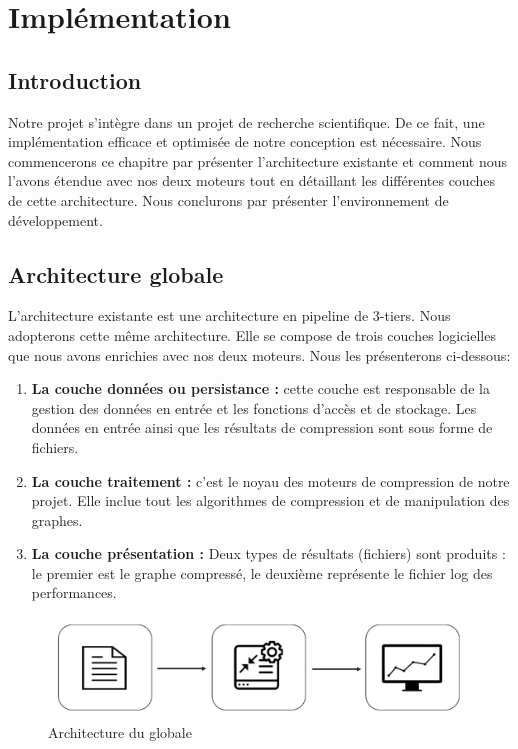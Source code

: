 \chapter{Implémentation}
	\section{Introduction}
	
	Notre projet s'intègre dans un projet de recherche scientifique. De ce fait, une implémentation efficace et optimisée de notre conception est nécessaire. Nous commencerons ce chapitre par présenter l'architecture existante et comment nous l'avons étendue avec nos deux moteurs tout en détaillant les différentes couches de cette architecture. Nous conclurons par présenter l'environnement de développement.
	
	
	\section{Architecture globale}
	
	L'architecture existante est une architecture en pipeline de 3-tiers. Nous  adopterons cette même architecture. Elle se compose de trois couches logicielles que nous avons enrichies avec nos deux moteurs. Nous les présenterons ci-dessous:
	
	\begin{enumerate}
	\item \textbf{La couche données ou persistance :} cette couche est responsable de la gestion des données en entrée et les fonctions d'accès et de stockage. Les données en entrée ainsi que les résultats de compression sont sous forme de fichiers.
	
	\item \textbf{La couche traitement :} c'est le noyau des moteurs de compression de notre projet. Elle inclue tout les algorithmes de compression et de manipulation des graphes. 
	
	\item \textbf{La couche présentation :}  Deux types de résultats (fichiers) sont produits : le premier est le graphe compressé, le deuxième représente le fichier log des performances. 
	\end{enumerate}
		
	
\begin{figure}[H]
	\centering
	
	\includegraphics[scale=0.35]{ressources/image/ArchGlob.jpg}
	\caption{Architecture du globale}
	\label{Img:archglob}
 \end{figure}
	
